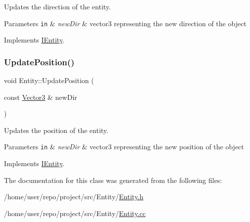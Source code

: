Updates the direction of the entity. 


\begin{DoxyParams}[1]{Parameters}
\mbox{\tt in}  & {\em new\+Dir} & vector3 representing the new direction of the object \\
\hline
\end{DoxyParams}


Implements \hyperlink{classIEntity_af24054e349dcdaea31a778427a34495d}{I\+Entity}.

\mbox{\label{classEntity_ab58e8c31ba272bdd1e945130af43493f}} 
\subsubsection{\texorpdfstring{Update\+Position()}{UpdatePosition()}}
{\footnotesize\ttfamily void Entity\+::\+Update\+Position (\begin{DoxyParamCaption}\item[{const \hyperlink{classVector3}{Vector3} \&}]{new\+Dir }\end{DoxyParamCaption})\hspace{0.3cm}{\ttfamily [virtual]}}



Updates the position of the entity. 


\begin{DoxyParams}[1]{Parameters}
\mbox{\tt in}  & {\em new\+Dir} & vector3 representing the new position of the object \\
\hline
\end{DoxyParams}


Implements \hyperlink{classIEntity_ad30f6845c8747534e7607ca97addbdc6}{I\+Entity}.



The documentation for this class was generated from the following files\+:\begin{DoxyCompactItemize}
\item 
/home/user/repo/project/src/\+Entity/\hyperlink{Entity_8h}{Entity.\+h}\item 
/home/user/repo/project/src/\+Entity/\hyperlink{Entity_8cc}{Entity.\+cc}\end{DoxyCompactItemize}
